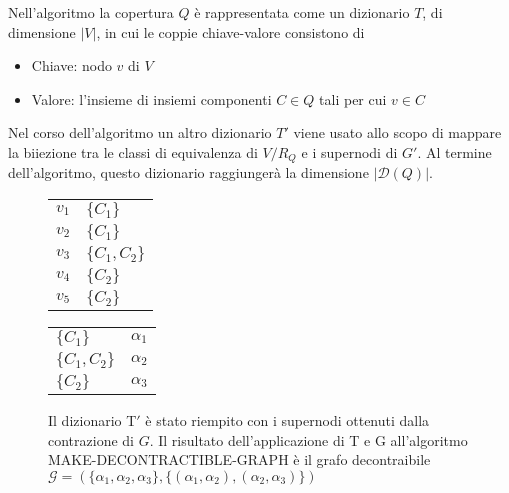 Nell'algoritmo la copertura $Q$ \`e rappresentata come un dizionario $T$, di dimensione $|V|$, in cui le coppie
chiave-valore consistono di
\begin{itemize}
    \item Chiave: nodo $v$ di $V$
    \item Valore: l'insieme di insiemi componenti $C \in Q$ tali per cui $v \in C$
\end{itemize}

Nel corso dell'algoritmo un altro dizionario $T'$ viene usato allo scopo di mappare la biiezione tra le classi
di equivalenza di $V/R_Q$ e i supernodi di $G'$.
Al termine dell'algoritmo, questo dizionario raggiunger\`a la dimensione $|\mathcal{D}(Q)|$.
\newline

	

    \begin{figure}[H]
    \begin{multicols}{3}
			\begin{tabularx}{0.8\linewidth} {
				| >{\raggedright\arraybackslash}X
				| >{\centering\arraybackslash}X | }
                \multicolumn{2}{>{\hsize=\dimexpr2\hsize+2\tabcolsep+\arrayrulewidth\relax}X}{\center$T$} \\
 				\hline
				$v_1$ & $\{C_1\}$\\
 				\hline
 				$v_2$ & $\{C_1\}$\\
				\hline
 				$v_3$ & $\{C_1, C_2\}$\\
 				\hline
 				$v_4$ & $\{C_2\}$\\
				\hline
 				$v_5$ & $\{C_2\}$\\
				\hline
			\end{tabularx}
            \columnbreak \centering
            \begin{tabularx}{0.8\linewidth} {
                | >{\raggedright\arraybackslash}X
                | >{\centering\arraybackslash}X | }
                \multicolumn{2}{>{\hsize=\dimexpr2\hsize+2\tabcolsep+\arrayrulewidth\relax}X}{\center$T'$} \\
                \hline
                $\{C_1\}$ & $\alpha_1$\\
                \hline
                $\{C_1, C_2\}$ & $\alpha_2$\\
                \hline
                $\{C_2\}$ & $\alpha_3$\\
                \hline
            \end{tabularx}
	        \columnbreak
            \centering %
    \end{multicols}
	    \caption{Il dizionario T$\mathcal{'}$ \`e stato riempito con i supernodi ottenuti dalla contrazione di $G$.
	    Il risultato dell'applicazione di T e G all'algoritmo MAKE-DECONTRACTIBLE-GRAPH \`e il grafo decontraibile
	    $\mathcal{G}=(\{\alpha_1, \alpha_2, \alpha_3\}, \{(\alpha_1, \alpha_2), (\alpha_2, \alpha_3)\})$ }
        \label{fig:make_decontractible_graph_example}
    \end{figure}

